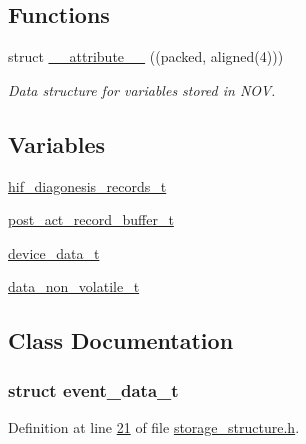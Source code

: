 \subsection*{Functions}
\begin{DoxyCompactItemize}
\item 
struct \hyperlink{a00003_ad8187eb7fe09751a387e3dcb11c51565}{\+\_\+\+\_\+attribute\+\_\+\+\_\+} ((packed, aligned(4)))
\begin{DoxyCompactList}\small\item\em Data structure for variables stored in N\+O\+V. \end{DoxyCompactList}\end{DoxyCompactItemize}
\subsection*{Variables}
\begin{DoxyCompactItemize}
\item 
\hyperlink{a00003_a4726b814166e222a6f13e21453f76d8d}{hif\+\_\+diagonesis\+\_\+records\+\_\+t}
\item 
\hyperlink{a00003_a826f1702f1b63c184df702204bea5122}{post\+\_\+act\+\_\+record\+\_\+buffer\+\_\+t}
\item 
\hyperlink{a00003_a95029dff9c90f6a6907353ba86eb3f33}{device\+\_\+data\+\_\+t}
\item 
\hyperlink{a00003_a8e66478e65e03ebc9434466e51c0ad0b}{data\+\_\+non\+\_\+volatile\+\_\+t}
\end{DoxyCompactItemize}


\subsection{Class Documentation}
\label{d0/d89/a00071}
\hypertarget{a00003_d0/d89/a00071}{}
\subsubsection{struct event\+\_\+data\+\_\+t}


Definition at line \hyperlink{a00003_source_l00021}{21} of file \hyperlink{a00003_source}{storage\+\_\+structure.\+h}.



